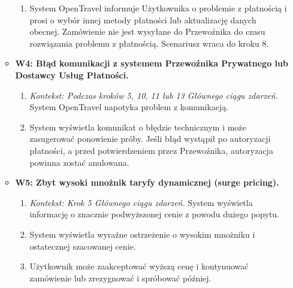 \documentclass[a4paper,12pt]{article}
\begin{document}
\begin{itemize}
\begin{itemize}
\begin{enumerate}
                    \item System OpenTravel informuje Użytkownika o problemie z płatnością i prosi o wybór innej metody płatności lub aktualizację danych obecnej. Zamówienie nie jest wysyłane do Przewoźnika do czasu rozwiązania problemu z płatnością. Scenariusz wraca do kroku 8.
                \end{enumerate}
            \item \textbf{W4: Błąd komunikacji z systemem Przewoźnika Prywatnego lub Dostawcy Usług Płatności.}
                \begin{enumerate}
                    \item \textit{Kontekst: Podczas kroków 5, 10, 11 lub 13 Głównego ciągu zdarzeń.} System OpenTravel napotyka problem z komunikacją.
                    \item System wyświetla komunikat o błędzie technicznym i może zasugerować ponowienie próby. Jeśli błąd wystąpił po autoryzacji płatności, a przed potwierdzeniem przez Przewoźnika, autoryzacja powinna zostać anulowana.
                \end{enumerate}
            \item \textbf{W5: Zbyt wysoki mnożnik taryfy dynamicznej (surge pricing).}
                 \begin{enumerate}
                    \item \textit{Kontekst: Krok 5 Głównego ciągu zdarzeń.} System wyświetla informację o znacznie podwyższonej cenie z powodu dużego popytu.
                    \item System wyświetla wyraźne ostrzeżenie o wysokim mnożniku i ostatecznej szacowanej cenie.
                    \item Użytkownik może zaakceptować wyższą cenę i kontynuować zamówienie lub zrezygnować i spróbować później.
                \end{enumerate}
        \end{itemize}
\end{itemize}
\end{document}
